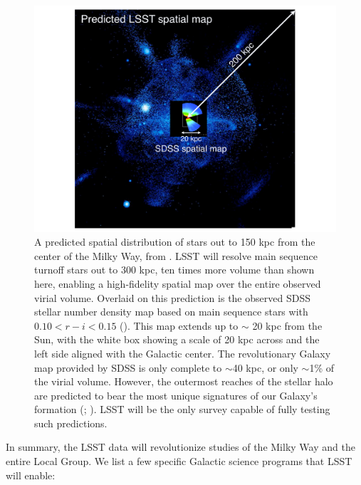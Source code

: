 \begin{figure}
\includegraphics[width=1.\hsize,clip]{BethMWhalo.pdf}
\caption{A predicted spatial distribution of stars out to 150 kpc from the center of the Milky Way,
from \cite{Bullock2005}.  LSST will resolve main sequence turnoff stars out to 300 kpc, ten times
more volume than shown here, enabling a high-fidelity spatial map over the entire observed virial volume.
Overlaid on this prediction is the observed SDSS stellar number density map based on main sequence stars
with $0.10 < r-i < 0.15$ (\cite{Juric2008}).  This map extends up to $\sim$ 20 kpc from the Sun, with
the white box showing a scale of 20 kpc across and the left side aligned with the Galactic center.
The revolutionary Galaxy map provided by SDSS is only complete to $\sim$40 kpc, or only $\sim$1\% of
the virial volume.  However, the outermost reaches of the stellar halo are predicted to bear the most unique
signatures of our Galaxy's formation (\cite{Johnston2008};  \cite{Cooper2010}).   LSST will be the only survey
capable of fully testing such predictions.}
\label{Fig:halo}
\end{figure}



In summary, the LSST data will revolutionize studies of the Milky Way and the entire Local Group. We list a few specific
Galactic science programs that LSST will enable:

